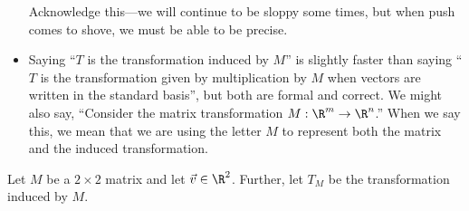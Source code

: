 \documentclass{problemset}
\begin{document}
\begin{annotation}
\begin{notes}
\begin{itemize}
					Acknowledge this---we will continue to be sloppy some times, but when push comes to
					shove, we must be able to be precise.
				\item Saying ``$T$ is the transformation induced by $M$'' is slightly faster
					than saying ``$T$ is the transformation given by multiplication by $M$ when
					vectors are written in the standard basis'',
					but both are formal and correct. We might also say, ``Consider the matrix transformation
					$M:\R^m\to\R^n$.'' When we say this, we mean that we are using the letter $M$ 
					to represent both the matrix and the induced transformation.
			\end{itemize}
		\end{notes}
	\end{annotation}
	\label{inducedTransform}
	Let $M$ be a $2\times 2$ matrix and let $\vec v\in\R^2$. Further, let $T_M$
	be the transformation induced by $M$.
\end{document}
